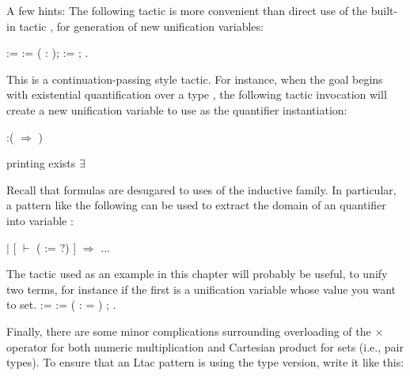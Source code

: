 \documentclass[12pt]{report}
\begin{document}
\begin{enumerate}
   A few hints: The following tactic is more convenient than direct use of the built-in tactic , for generation of new unification variables: \begin{coqdoccode}
\coqdocemptyline
\coqdocnoindent
{}    :=   :=  \coqdoceol
\coqdocindent{1.00em}
 ( : );   :=        ;  .\coqdoceol
\coqdocemptyline
\coqdocemptyline
\end{coqdoccode}
This is a continuation-passing style tactic.  For instance, when the goal begins with existential quantification over a type , the following tactic invocation will create a new unification variable to use as the quantifier instantiation:


  :(  \ensuremath{\Rightarrow}  ) 

 printing exists $\exists$ 

 Recall that  formulas are desugared to uses of the  inductive family.  In particular, a pattern like the following can be used to extract the domain of an  quantifier into variable :


\ensuremath{|} [ \ensuremath{\vdash}  ( := ?) \coqdocvar{\_} ] \ensuremath{\Rightarrow} ...


    The  tactic used as an example in this chapter will probably be useful, to unify two terms, for instance if the first is a unification variable whose value you want to set.
\coqdoceol
\coqdocemptyline
\coqdocnoindent
{}    :=   :=  \coqdoceol
\coqdocindent{1.00em}
 ( :  = )  ;  .

\coqdocemptyline


    Finally, there are some minor complications surrounding overloading of the \ensuremath{\times} operator for both numeric multiplication and Cartesian product for sets (i.e., pair types).  To ensure that an Ltac pattern is using the type version, write it like this:



\end{enumerate}
\end{document}
